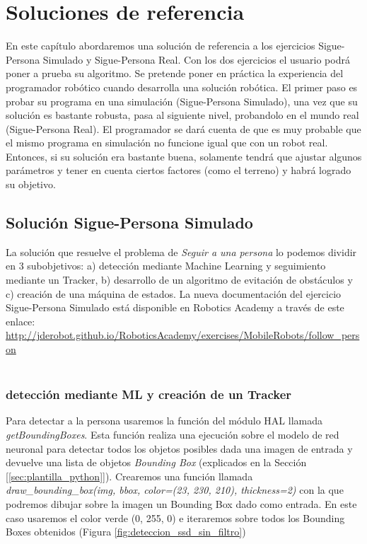 \chapter{Soluciones de referencia}
\label{cap:capitulo6}

En este capítulo abordaremos una solución de referencia a los ejercicios Sigue-Persona Simulado y Sigue-Persona Real. Con los dos ejercicios el usuario podrá poner a prueba su algoritmo. Se pretende poner en práctica la experiencia del programador robótico cuando desarrolla una solución robótica. El primer paso es probar su programa en una simulación (Sigue-Persona Simulado), una vez que su solución es bastante robusta, pasa al siguiente nivel, probandolo en el mundo real (Sigue-Persona Real). El programador se dará cuenta de que es muy probable que el mismo programa en simulación no funcione igual que con un robot real. Entonces, si su solución era bastante buena, solamente tendrá que ajustar algunos parámetros y tener en cuenta ciertos factores (como el terreno) y habrá logrado su objetivo.\\

\section{Solución Sigue-Persona Simulado}
\label{sec:solucion_sigue_personas_simulado}

La solución que resuelve el problema de \textit{Seguir a una persona} lo podemos dividir en 3 subobjetivos: a) detección mediante Machine Learning y seguimiento mediante un Tracker, b) desarrollo de un algoritmo de evitación de obstáculos y c) creación de una máquina de estados. La nueva documentación del ejercicio Sigue-Persona Simulado está disponible en Robotics Academy a través de este enlace: \url{http://jderobot.github.io/RoboticsAcademy/exercises/MobileRobots/follow_person}\\\\



\subsection{detección mediante ML y creación de un Tracker}
\label{subsec:ml_tracker}
Para detectar a la persona usaremos la función del módulo HAL llamada \textit{getBoundingBoxes}. Esta función realiza una ejecución sobre el modelo de red neuronal para detectar todos los objetos posibles dada una imagen de entrada y devuelve una lista de objetos \textit{Bounding Box} (explicados en la Sección [\ref{sec:plantilla_python}]). Crearemos una función llamada \textit{draw\_bounding\_box(img, bbox, color=(23, 230, 210), thickness=2)} con la que podremos dibujar sobre la imagen un Bounding Box dado como entrada. En este caso usaremos el color verde (0, 255, 0) e iteraremos sobre todos los Bounding Boxes obtenidos (Figura \ref{fig:deteccion_ssd_sin_filtro})\\

